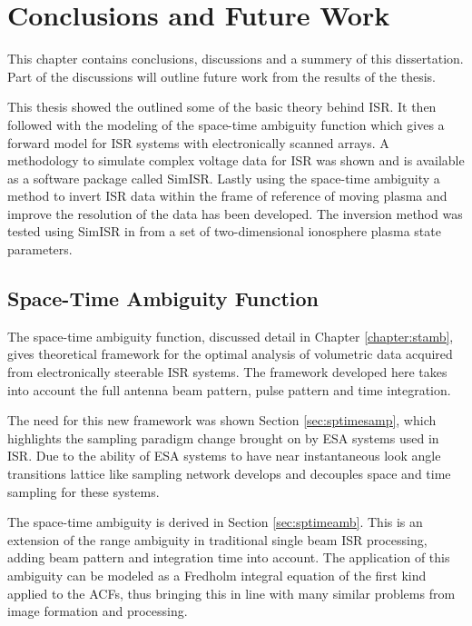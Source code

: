 \chapter{Conclusions and Future Work}
\label{chapter:Conclusions}
\thispagestyle{myheadings}
\graphicspath{{6_Conclusion/Figures/}}

\graphicspath{{6_Conclusion/Figures/}}
This chapter contains conclusions, discussions and a summery of this dissertation. Part of the discussions will outline future work from the results of the thesis.

This thesis showed the outlined some of the basic theory behind ISR. It then followed with the modeling of the space-time ambiguity function which gives a forward model for ISR systems with electronically scanned arrays. A methodology to simulate complex voltage data for ISR was shown and is available as a software package called SimISR. Lastly using the space-time ambiguity a method to invert ISR data within the frame of reference of moving plasma and improve the resolution of the data has been developed. The inversion method was tested using SimISR in from a set of two-dimensional ionosphere plasma state parameters.

\section{Space-Time Ambiguity Function}
The space-time ambiguity function, discussed detail in Chapter \ref{chapter:stamb}, gives theoretical framework for the optimal analysis of volumetric data acquired from electronically steerable ISR systems. The framework developed here takes into account the full antenna beam pattern, pulse pattern and time integration.

The need for this new framework was shown Section \ref{sec:sptimesamp}, which highlights the sampling paradigm change brought on by ESA systems used in ISR. Due to the ability of ESA systems to have near instantaneous look angle transitions lattice like sampling network develops and decouples space and time sampling for these systems.

The space-time ambiguity is derived in Section \ref{sec:sptimeamb}. This is an extension of the range ambiguity in traditional single beam ISR processing, adding beam pattern and integration time into account. The application of this ambiguity can be modeled as a Fredholm integral equation of the first kind applied to the ACFs, thus bringing this in line with many similar problems from image formation and processing.

